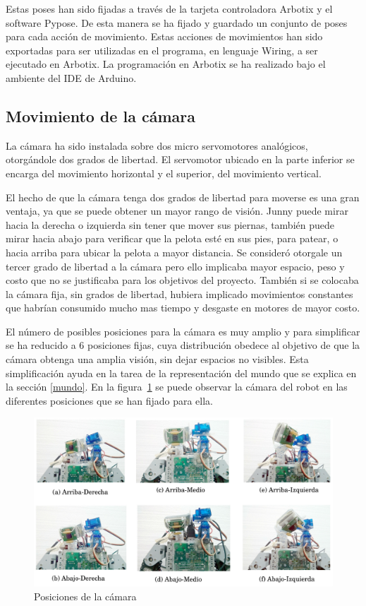 Estas poses han sido fijadas a través de la tarjeta controladora Arbotix y el software Pypose. De esta manera se ha fijado y guardado un conjunto de poses para cada acción de movimiento. Estas acciones de movimientos han sido exportadas para ser utilizadas en el programa, en lenguaje Wiring, a ser ejecutado en Arbotix. La programación en Arbotix se ha realizado bajo el ambiente del \gls{IDE} de Arduino. 


\subsection{Movimiento de la cámara}\label{movCamara}
La cámara ha sido instalada sobre dos micro servomotores analógicos, otorgándole dos grados de libertad. El servomotor ubicado en la parte inferior se encarga del movimiento horizontal y el superior, del movimiento vertical.

El hecho de  que la cámara tenga dos grados de libertad para moverse es una gran ventaja, ya que se puede obtener un mayor rango de visión. Junny puede mirar hacia la derecha o izquierda sin tener que mover sus piernas, también puede mirar hacia abajo para verificar que la pelota esté en sus pies, para patear, o hacia arriba para ubicar la pelota a mayor distancia.
 Se consideró otorgale un tercer grado de libertad a la c\'amara pero ello implicaba mayor espacio, peso y costo que no se justificaba para los objetivos del proyecto. Tambi\'en si se colocaba la c\'amara fija, sin grados de libertad, hubiera implicado movimientos constantes que habrían consumido mucho mas tiempo y desgaste en motores de mayor costo.

El número de posibles posiciones para la cámara es muy amplio y para simplificar se ha reducido a 6 posiciones fijas, cuya distribución obedece al objetivo de que la cámara obtenga una amplia visión, sin dejar espacios no visibles. Esta simplificación ayuda en la tarea de la representación del mundo que se explica en la sección \ref{mundo}. En la figura~\ref{posicionesCam} se puede observar la cámara del robot en las diferentes posiciones que se han fijado para ella.

\begin{figure}[hbtp]
\centering
\includegraphics[scale=0.14]{imagenes/posicionesCamara.jpg}
\caption{Posiciones de la cámara }
\label{posicionesCam}
\end{figure}

